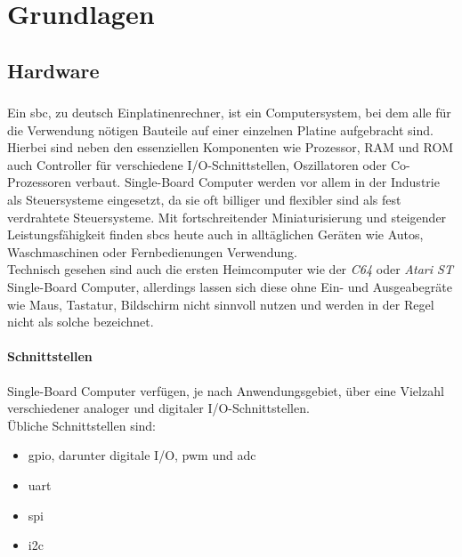 \documentclass[thesis.tex]{subfiles}
\begin{document}
\chapter{Grundlagen}

\section{Hardware}

\subsection{}
Ein \gls{sbc}, zu deutsch Einplatinenrechner, ist ein Computersystem, bei dem alle für die Verwendung nötigen Bauteile auf einer einzelnen Platine aufgebracht sind. Hierbei sind neben den essenziellen Komponenten wie Prozessor, RAM und ROM auch Controller für verschiedene I/O-Schnittstellen, Oszillatoren oder Co-Prozessoren verbaut. Single-Board Computer werden vor allem in der Industrie als Steuersysteme eingesetzt, da sie oft billiger und flexibler sind als fest verdrahtete Steuersysteme. Mit fortschreitender Miniaturisierung und steigender Leistungsfähigkeit finden \glspl{sbc} heute auch in alltäglichen Geräten wie Autos, Waschmaschinen oder Fernbedienungen Verwendung.\\

Technisch gesehen sind auch die ersten Heimcomputer wie der \emph{C64} oder \emph{Atari ST} Single-Board Computer, allerdings lassen sich diese ohne Ein- und Ausgeabegräte wie Maus, Tastatur, Bildschirm nicht sinnvoll nutzen und werden in der Regel nicht als solche bezeichnet.


\subsubsection{Schnittstellen}
Single-Board Computer verfügen, je nach Anwendungsgebiet, über eine Vielzahl verschiedener analoger und digitaler I/O-Schnittstellen.\\

\noindent Übliche Schnittstellen sind:

\begin{itemize}
\item \gls{gpio}, darunter digitale I/O, \gls{pwm} und \gls{adc}
\item \gls{uart}
\item \gls{spi}
\item \gls{i2c}
\end{itemize}
\end{document}
